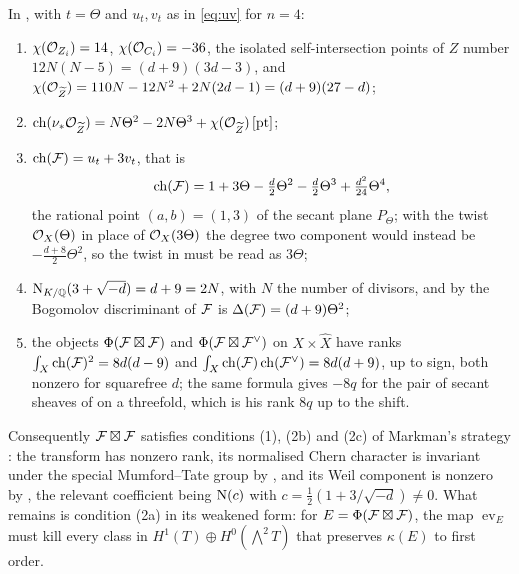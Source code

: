 \begin{proposition}
\label{prop:markman8}
In , with $t=\Theta$ and $u_{t},v_{t}$ as in
\eqref{eq:uv} for $n=4$:
\begin{enumerate}[label=\textup{(\roman*)},nosep]
\item $\chi(\mathcal{O}_{Z_{i}})=14$, $\chi(\mathcal{O}_{C_{i}})=-36$, the isolated
  self-intersection points of $Z$ number $12N(N-5)=(d+9)(3d-3)$, and
  $\chi(\mathcal{O}_{\widetilde Z})=110N-12N^{2}+2N(2d-1)=(d+9)(27-d)$;
\item $\operatorname{ch}(\nu_{*}\mathcal{O}_{\widetilde Z})=N\Theta^{2}-2N\Theta^{3}
  +\chi(\mathcal{O}_{\widetilde Z})\,[\mathrm{pt}]$;
\item $\operatorname{ch}(\mathcal{F})=u_{t}+3v_{t}$, that is
  \[
    \operatorname{ch}(\mathcal{F})=1+3\Theta-\tfrac{d}{2}\Theta^{2}-\tfrac{d}{2}\Theta^{3}
      +\tfrac{d^{2}}{24}\Theta^{4},
  \]
  the rational point $(a,b)=(1,3)$ of the secant plane $P_{\Theta}$; with
  the twist $\mathcal{O}_{X}(\Theta)$ in place of $\mathcal{O}_{X}(3\Theta)$ the degree two
  component would instead be $-\tfrac{d+8}{2}\Theta^{2}$, so the twist in
  \cite[Section 12]{Mar25b} must be read as $3\Theta$;
\item $\mathrm{N}_{K/\mathbb{Q}}(3+\sqrt{-d})=d+9=2N$, with $N$ the number of divisors, and by
   the Bogomolov discriminant of $\mathcal{F}$ is
  $\Delta(\mathcal{F})=(d+9)\Theta^{2}$;
\item the objects $\Phi(\mathcal{F}\boxtimes\mathcal{F})$ and $\Phi(\mathcal{F}\boxtimes\mathcal{F}^{\vee})$
  on $X\times\widehat X$ have ranks
  $\int_{X}\operatorname{ch}(\mathcal{F})^{2}=8d(d-9)$ and
  $\int_{X}\operatorname{ch}(\mathcal{F})\operatorname{ch}(\mathcal{F}^{\vee})=8d(d+9)$, up to sign, both nonzero for
  squarefree $d$; the same formula gives $-8q$ for the pair of secant sheaves
  of \cite[Section 11]{Mar25b} on a threefold, which is his rank $8q$ up to
  the shift.
\end{enumerate}
Consequently $\mathcal{F}\boxtimes\mathcal{F}$ satisfies conditions (1), (2b) and (2c) of
Markman's strategy \cite[Section 4]{Mar25b}: the transform has nonzero rank,
its normalised Chern character is invariant under the special Mumford--Tate
group by \cite[Corollary 9.2]{Mar25b}, and its Weil component is nonzero by
\cite[Proposition 10.2]{Mar25b}, the relevant coefficient being
$\mathrm{N}(c)$ with $c=\tfrac12(1+3/\sqrt{-d})\ne0$. What remains is condition
(2a) in its weakened form: for $E=\Phi(\mathcal{F}\boxtimes\mathcal{F})$, the map
$\operatorname{ev}_{E}$ must kill every class in
$H^{1}(T)\oplus H^{0}(\bigwedge^{2}T)$ that preserves $\kappa(E)$ to first
order.
\end{proposition}

